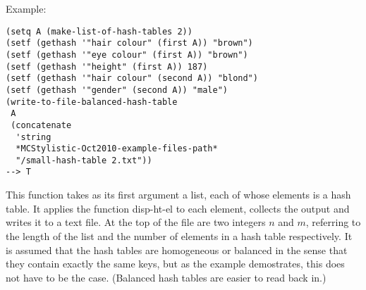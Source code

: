 \vspace{0.5cm}
\noindent Example:
\begin{verbatim}
(setq A (make-list-of-hash-tables 2))
(setf (gethash '"hair colour" (first A)) "brown")
(setf (gethash '"eye colour" (first A)) "brown")
(setf (gethash '"height" (first A)) 187)
(setf (gethash '"hair colour" (second A)) "blond")
(setf (gethash '"gender" (second A)) "male")
(write-to-file-balanced-hash-table
 A
 (concatenate
  'string
  *MCStylistic-Oct2010-example-files-path*
  "/small-hash-table 2.txt"))
--> T
\end{verbatim}

\noindent This function takes as its first argument a
list, each of whose elements is a hash table. It
applies the function disp-ht-el to each element,
collects the output and writes it to a text file. At
the top of the file are two integers $n$ and $m$,
referring to the length of the list and the number of
elements in a hash table respectively. It is assumed
that the hash tables are homogeneous or balanced in
the sense that they contain exactly the same keys, but
as the example demostrates, this does not have to be
the case. (Balanced hash tables are easier to read
back in.)





